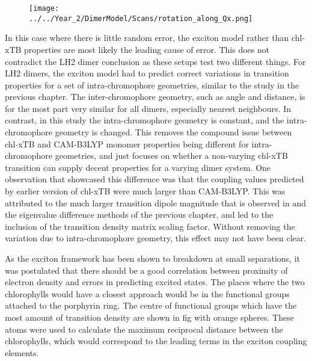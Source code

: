 \begin{figure}
    \centering
    \texttt{[image: ../../Year\_2/DimerModel/Scans/rotation\_along\_Qx.png]}
\end{figure}

In this case where there is little random error, the exciton model rather than chl-xTB
properties are most likely the leading cause of error. This does not contradict 
the LH2 dimer conclusion as these setups test two different things. For LH2 dimers,
the exciton model had to predict correct variations in transition properties for
a set of intra-chromophore geometries, similar to the study in the previous chapter.
The inter-chromophore geometry, such as angle and distance, is for the most part
very similar for all dimers, especially nearest neighbours. In contrast, in this
study the intra-chromophore geometry is constant, and the intra-chromophore geometry
is changed. This removes the compound issue between chl-xTB and CAM-B3LYP monomer
properties being different for intra-chromophore geometries, and just focuses on
whether a non-varying chl-xTB transition can supply decent properties for a varying
dimer system. One observation that showcased this difference was that the coupling
values predicted by earlier version of chl-xTB were much larger than CAM-B3LYP. 
This was attributed to the much larger transition dipole magnitude that is observed
in \dscf and the eigenvalue difference methods of the previous chapter, and led
to the inclusion of the transition density matrix scaling factor. Without removing
the variation due to intra-chromophore geometry, this effect may not have been clear.

As the exciton framework has been shown to breakdown at small separations, it was
postulated that there should be a good correlation between proximity of electron
density and errors in predicting excited states. The places where the two chlorophylls
would have a closest approach would be in the functional groups attached to the 
porphyrin ring. The centre of functional groups which have the most amount of transition
density are shown in fig with orange spheres. These atoms were used to calculate
the maximum reciprocal distance between the chlorophylls, which would correspond
to the leading terms in the exciton coupling elements.


